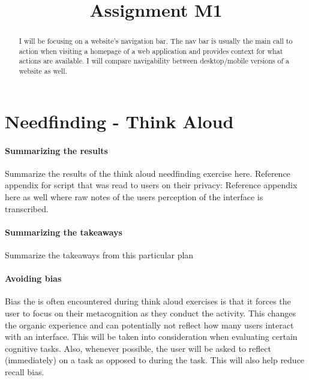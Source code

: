 

\title{Assignment M1\\}



\maketitle
\thispagestyle{fancy}

% 

\begin{abstract}
I will be focusing on a website’s navigation bar. The nav bar is usually the main call to action when visiting a homepage of a web application and provides context for what actions are available. I will compare navigability between desktop/mobile versions of a website as well.
\end{abstract}


\section{Needfinding - Think Aloud}

\paragraph{Summarizing the results}
Summarize the results of the think aloud needfinding exercise here.
Reference appendix for script that was read to users on their privacy:
Reference appendix here as well where raw notes of the users perception of the interface is transcribed.

\paragraph{Summarizing the takeaways}
Summarize the takeaways from this particular plan

\paragraph{Avoiding bias}
Bias the is often encountered during think aloud exercises is that it forces the user to focus on their metacognition as they conduct the activity. This changes the organic experience and can potentially not reflect how many users interact with an interface. This will be taken into consideration when evaluating certain cognitive tasks. Also, whenever possible, the user will be asked to reflect (immediately) on a task as opposed to during the task. This will also help reduce recall bias.

